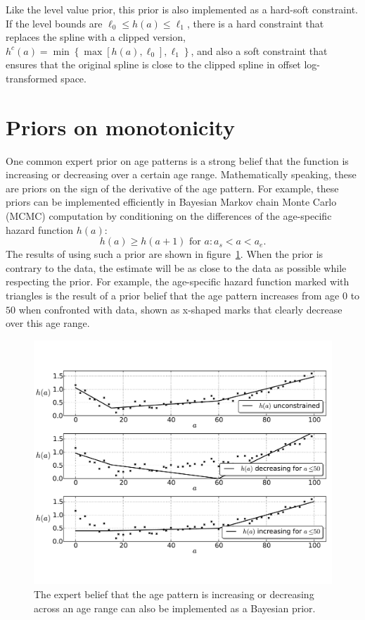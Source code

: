 Like the level value prior, this prior is also implemented as a
hard-soft constraint.  If the level bounds are $\ell_0 \leq h(a)
\leq \ell_1$, there is a hard constraint that replaces the spline with a
clipped version, $h^c(a) = \min\left\{\max\left[h(a), \ell_0\right], \ell_1\right\}$, and
also a soft constraint that ensures that the original spline is close to the clipped
spline in offset log-transformed space.

\section{Priors on monotonicity}

One common expert prior on age patterns is a strong belief that the
function is increasing or decreasing over a certain age
range. Mathematically speaking, these are priors on the sign of the
derivative of the age pattern.  For example, these priors can be implemented efficiently in
Bayesian Markov chain Monte Carlo (MCMC) computation by conditioning on the differences of the
age-specific hazard function $h(a)$:
\[
h(a) \geq h(a+1) \text{ for } a : a_s < a < a_e.
\]
The results of using such a prior are shown in
figure~\ref{monotone-age-pattern}.
When the prior is contrary to the data, the estimate will be
  as close to the data as possible while respecting the prior.  For
  example, the age-specific hazard function marked with triangles is the result
  of a prior belief that the age pattern increases from age $0$ to
  $50$ when confronted with data, shown as x-shaped marks that
  clearly decrease over this age range.

\begin{figure}[h]
\begin{center}
\includegraphics[width=\textwidth]{monotone-smoothing-splines.pdf}
\caption[An informative prior that the age pattern is increasing or
  decreasing across an age range.]{The expert belief that the age
  pattern is increasing or
  decreasing across an age range can also be implemented as a Bayesian
  prior.  }
\label{monotone-age-pattern}
\end{center}
\end{figure}


